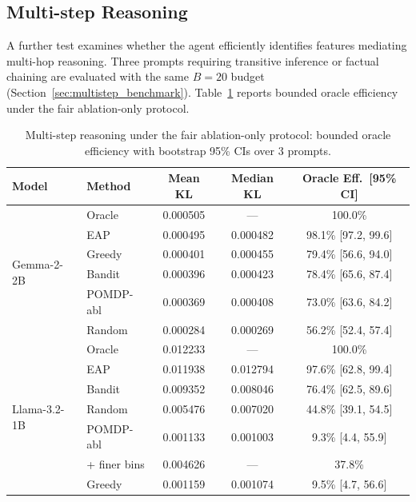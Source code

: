 \subsection{Multi-step Reasoning}
\label{sec:multistep}

A further test examines whether the agent efficiently identifies features
mediating multi-hop reasoning.  Three prompts requiring transitive
inference or factual chaining are evaluated with the same $B=20$
budget (Section~\ref{sec:multistep_benchmark}).  Table~\ref{tab:multistep}
reports bounded oracle efficiency under the fair ablation-only protocol.

\begin{table}[H]
\centering
\caption{Multi-step reasoning under the fair ablation-only protocol:
bounded oracle efficiency with bootstrap 95\% CIs over 3 prompts.}
\label{tab:multistep}
{\small
\begin{tabular}{llccc}
\toprule
\textbf{Model} & \textbf{Method} & \textbf{Mean KL} & \textbf{Median KL} & \textbf{Oracle Eff.\ [95\% CI]} \\
\midrule
\multirow{6}{*}{Gemma-2-2B}
 & Oracle    & 0.000505 & ---      & 100.0\% \\
 & EAP       & 0.000495 & 0.000482 & 98.1\% [97.2, 99.6] \\
 & Greedy    & 0.000401 & 0.000455 & 79.4\% [56.6, 94.0] \\
 & Bandit    & 0.000396 & 0.000423 & 78.4\% [65.6, 87.4] \\
 & POMDP-abl & 0.000369 & 0.000408 & 73.0\% [63.6, 84.2] \\
 & Random    & 0.000284 & 0.000269 & 56.2\% [52.4, 57.4] \\
\midrule
\multirow{7}{*}{Llama-3.2-1B}
 & Oracle    & 0.012233 & ---      & 100.0\% \\
 & EAP       & 0.011938 & 0.012794 & 97.6\% [62.8, 99.4] \\
 & Bandit    & 0.009352 & 0.008046 & 76.4\% [62.5, 89.6] \\
 & Random    & 0.005476 & 0.007020 & 44.8\% [39.1, 54.5] \\
 & POMDP-abl & 0.001133 & 0.001003 & 9.3\% [4.4, 55.9] \\
 & \;+ finer bins & 0.004626 & --- & 37.8\% \\
 & Greedy    & 0.001159 & 0.001074 & 9.5\% [4.7, 56.6] \\
\bottomrule
\end{tabular}%
}
\end{table}

